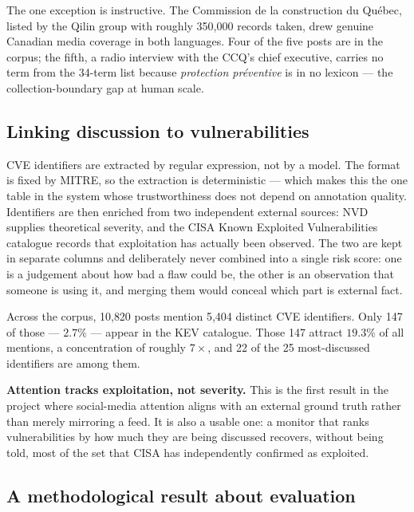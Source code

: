 \documentclass[11pt]{article}
\begin{document}
The one exception is instructive. The Commission de la construction du
Qu\'ebec, listed by the Qilin group with roughly 350{,}000 records taken, drew
genuine Canadian media coverage in both languages. Four of the five posts are
in the corpus; the fifth, a radio interview with the CCQ's chief executive,
carries no term from the 34-term list because \emph{protection pr\'eventive} is
in no lexicon --- the collection-boundary gap at human scale.

\subsection*{Linking discussion to vulnerabilities}

CVE identifiers are extracted by regular expression, not by a model. The format
is fixed by MITRE, so the extraction is deterministic --- which makes this the
one table in the system whose trustworthiness does not depend on annotation
quality. Identifiers are then enriched from two independent external sources:
NVD supplies theoretical severity, and the CISA Known Exploited Vulnerabilities
catalogue records that exploitation has actually been observed. The two are kept
in separate columns and deliberately never combined into a single risk score:
one is a judgement about how bad a flaw could be, the other is an observation
that someone is using it, and merging them would conceal which part is external
fact.

Across the corpus, 10{,}820 posts mention 5{,}404 distinct CVE identifiers.
Only 147 of those --- $2.7\%$ --- appear in the KEV catalogue. Those 147 attract
$19.3\%$ of all mentions, a concentration of roughly $7\times$, and 22 of the 25
most-discussed identifiers are among them.

\begin{keybox}
\textbf{Attention tracks exploitation, not severity.} This is the first result
in the project where social-media attention aligns with an external ground truth
rather than merely mirroring a feed. It is also a usable one: a monitor that
ranks vulnerabilities by how much they are being discussed recovers, without
being told, most of the set that CISA has independently confirmed as exploited.
\end{keybox}

\subsection*{A methodological result about evaluation}
\end{document}
